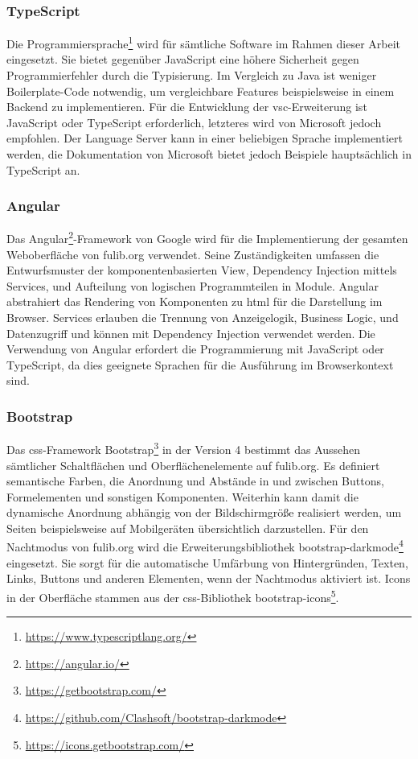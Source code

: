 \subsubsection{TypeScript}
Die Programmiersprache\footnote{\url{https://www.typescriptlang.org/}} wird für sämtliche Software im Rahmen dieser Arbeit eingesetzt.
Sie bietet gegenüber JavaScript eine höhere Sicherheit gegen Programmierfehler durch die Typisierung.
Im Vergleich zu Java ist weniger Boilerplate-Code notwendig, um vergleichbare Features beispielsweise in einem Backend zu implementieren.
Für die Entwicklung der \ac{vsc}-Erweiterung ist JavaScript oder TypeScript erforderlich, letzteres wird von Microsoft jedoch empfohlen.\cite{vsc-first-extension}
Der Language Server kann in einer beliebigen Sprache implementiert werden, die Dokumentation von Microsoft bietet jedoch Beispiele hauptsächlich in TypeScript an.\cite{vsc-language-server-guide}

\subsubsection{Angular}
Das Angular\footnote{\url{https://angular.io/}}-Framework von Google wird für die Implementierung der gesamten Weboberfläche von fulib.org verwendet.
Seine Zuständigkeiten umfassen die Entwurfsmuster der komponentenbasierten View, Dependency Injection mittels Services, und Aufteilung von logischen Programmteilen in Module.
Angular abstrahiert das Rendering von Komponenten zu \ac{html} für die Darstellung im Browser.
Services erlauben die Trennung von Anzeigelogik, Business Logic, und Datenzugriff und können mit Dependency Injection verwendet werden.
Die Verwendung von Angular erfordert die Programmierung mit JavaScript oder TypeScript, da dies geeignete Sprachen für die Ausführung im Browserkontext sind.

\subsubsection{Bootstrap}
Das \ac{css}-Framework Bootstrap\footnote{\url{https://getbootstrap.com/}} in der Version 4 bestimmt das Aussehen sämtlicher Schaltflächen und Oberflächenelemente auf fulib.org.
Es definiert semantische Farben, die Anordnung und Abstände in und zwischen Buttons, Formelementen und sonstigen Komponenten.
Weiterhin kann damit die dynamische Anordnung abhängig von der Bildschirmgröße realisiert werden, um Seiten beispielsweise auf Mobilgeräten übersichtlich darzustellen.
Für den Nachtmodus von fulib.org wird die Erweiterungsbibliothek bootstrap-darkmode\footnote{\url{https://github.com/Clashsoft/bootstrap-darkmode}} eingesetzt.
Sie sorgt für die automatische Umfärbung von Hintergründen, Texten, Links, Buttons und anderen Elementen, wenn der Nachtmodus aktiviert ist.
Icons in der Oberfläche stammen aus der \ac{css}-Bibliothek bootstrap-icons\footnote{\url{https://icons.getbootstrap.com/}}.


